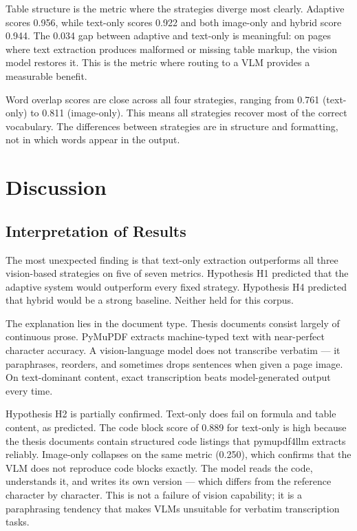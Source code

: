 \documentclass[12pt]{article}
\begin{document}
Table structure is the metric where the strategies diverge most clearly.
Adaptive scores 0.956, while text-only scores 0.922 and both image-only
and hybrid score 0.944. The 0.034 gap between adaptive and text-only is
meaningful: on pages where text extraction produces malformed or missing
table markup, the vision model restores it. This is the metric where
routing to a VLM provides a measurable benefit.

Word overlap scores are close across all four strategies, ranging from
0.761 (text-only) to 0.811 (image-only). This means all strategies
recover most of the correct vocabulary. The differences between strategies
are in structure and formatting, not in which words appear in the output.


\section{Discussion}

\subsection{Interpretation of Results}

The most unexpected finding is that text-only extraction outperforms
all three vision-based strategies on five of seven metrics.
Hypothesis H1 predicted that the adaptive system would outperform every
fixed strategy. Hypothesis H4 predicted that hybrid would be a strong
baseline. Neither held for this corpus.

The explanation lies in the document type. Thesis documents consist
largely of continuous prose. PyMuPDF extracts machine-typed text with
near-perfect character accuracy. A vision-language model does not
transcribe verbatim — it paraphrases, reorders, and sometimes drops
sentences when given a page image. On text-dominant content, exact
transcription beats model-generated output every time.

Hypothesis H2 is partially confirmed. Text-only does fail on formula
and table content, as predicted. The code block score of 0.889 for
text-only is high because the thesis documents contain structured code
listings that pymupdf4llm extracts reliably. Image-only collapses on
the same metric (0.250), which confirms that the VLM does not reproduce
code blocks exactly. The model reads the code, understands it, and
writes its own version — which differs from the reference character by
character. This is not a failure of vision capability; it is a
paraphrasing tendency that makes VLMs unsuitable for verbatim
transcription tasks.
\end{document}

